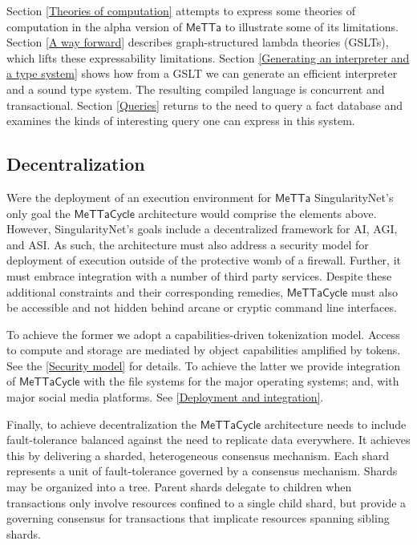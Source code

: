 \documentclass{article}
\newcommand{\MC}{\mathsf{MeTTaCycle}}
\begin{document}
Section \ref{Theories of computation} attempts to express some
theories of computation in the alpha version of $\mathsf{MeTTa}$ to
illustrate some of its limitations.  Section \ref{A way forward}
describes graph-structured lambda theories (GSLTs), which lifts these
expressability limitations.  Section \ref{Generating an interpreter
  and a type system} shows how from a GSLT we can generate an
efficient interpreter and a sound type system.  The resulting compiled
language is concurrent and transactional. Section \ref{Queries}
returns to the need to query a fact database and examines the kinds of
interesting query one can express in this system.

\subsection{Decentralization}

Were the deployment of an execution environment for $\mathsf{MeTTa}$
SingularityNet's only goal the $\MC$ architecture would comprise the
elements above. However, SingularityNet's goals include a
decentralized framework for AI, AGI, and ASI. As such, the
architecture must also address a security model for deployment of
execution outside of the protective womb of a firewall. Further, it
must embrace integration with a number of third party
services. Despite these additional constraints and their corresponding
remedies, $\MC$ must also be accessible and not hidden behind arcane
or cryptic command line interfaces.

To achieve the former we adopt a capabilities-driven tokenization
model. Access to compute and storage are mediated by object
capabilities amplified by tokens. See the \ref{Security model} for
details. To achieve the latter we provide integration of $\MC$ with
the file systems for the major operating systems; and, with major
social media platforms. See \ref{Deployment and integration}.

Finally, to achieve decentralization the $\MC$ architecture needs to
include fault-tolerance balanced against the need to replicate data
everywhere. It achieves this by delivering a sharded, heterogeneous
consensus mechanism. Each shard represents a unit of fault-tolerance
governed by a consensus mechanism. Shards may be organized into a
tree. Parent shards delegate to children when transactions only
involve resources confined to a single child shard, but provide a
governing consensus for transactions that implicate resources spanning
sibling shards.
\end{document}
